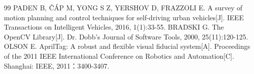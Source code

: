 \begin{thebibliography}{99}
 PADEN B, ČÁP M, YONG S Z, YERSHOV D, FRAZZOLI E. A survey of motion planning and control techniques for self-driving urban vehicles[J]. IEEE Transactions on Intelligent Vehicles, 2016, 1(1):33-55.
 BRADSKI G. The OpenCV Library[J]. Dr. Dobb’s Journal of Software Tools, 2000, 25(11):120-125.
 OLSON E. AprilTag: A robust and flexible visual fiducial system[A]. Proceedings of the 2011 IEEE International Conference on Robotics and Automation[C]. Shanghai: IEEE, 2011：3400-3407.
\end{thebibliography}